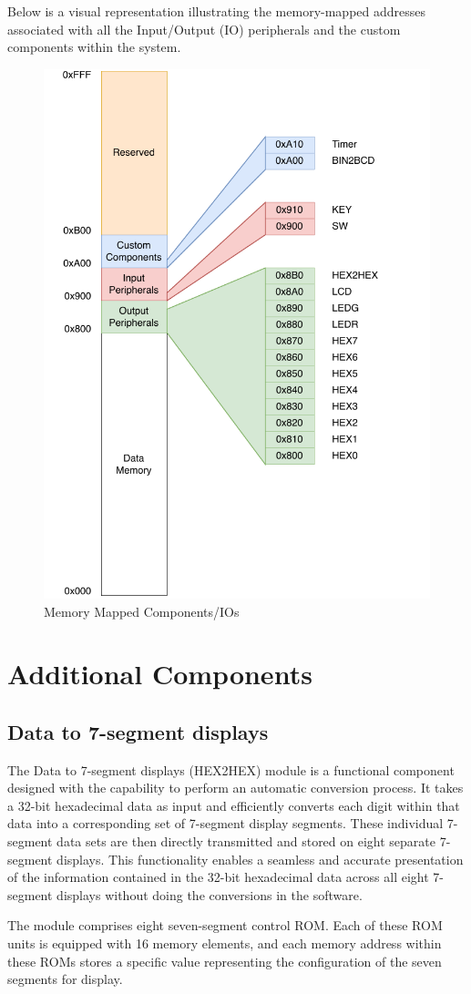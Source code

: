 \documentclass[12pt,a4paper,oneside]{book} %
\begin{document}
Below is a visual representation illustrating the memory-mapped addresses associated with all the Input/Output (IO) peripherals and the custom components within the system.

\begin{figure}[H]
    \centering
    \includegraphics[width=.6\textwidth]{images/memmap.pdf}
    \caption{Memory Mapped Components/IOs}
\end{figure}

\section{Additional Components}
\subsection{Data to 7-segment displays}
The Data to 7-segment displays (HEX2HEX) module is a functional component designed with the capability to perform an automatic conversion process. It takes a 32-bit hexadecimal data as input and efficiently converts each digit within that data into a corresponding set of 7-segment display segments. These individual 7-segment data sets are then directly transmitted and stored on eight separate 7-segment displays. This functionality enables a seamless and accurate presentation of the information contained in the 32-bit hexadecimal data across all eight 7-segment displays without doing the conversions in the software.

The module comprises eight seven-segment control ROM. Each of these ROM units is equipped with 16 memory elements, and each memory address within these ROMs stores a specific value representing the configuration of the seven segments for display.
\end{document}
